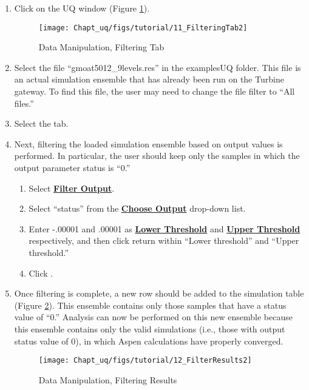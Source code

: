 \begin{enumerate}
	\item{Click  on the UQ window (Figure \ref{fig:uqt_data_filter}).}
	\begin{figure}[H]
		\centering
		\texttt{[image: Chapt\_uq/figs/tutorial/11\_FilteringTab2]}
		\caption{Data Manipulation, Filtering Tab}
		\label{fig:uqt_data_filter}
	\end{figure}
	\item{Select the file ``gmoat5012\_9levels.res'' in the examples\bs UQ folder. This
		file is an actual simulation ensemble that has already been run on the Turbine gateway.
		To find this file, the user may need to change the file filter to ``All files.''}
	\item{Select the  tab.}
	\item{Next, filtering the loaded simulation ensemble based on output values is performed. In particular,
		the user should keep only the samples in which the output parameter status is ``0.''}
	\begin{enumerate}
		\item{Select \textbf{\underline{Filter Output}}.}
		\item{Select ``status'' from the \textbf{\underline{Choose Output}} drop-down list.}
		\item{Enter -.00001 and .00001 as \textbf{\underline{Lower Threshold}} and \textbf{\underline{Upper Threshold}}
			respectively, and then click return within ``Lower threshold'' and ``Upper threshold.''}
		\item{Click .}
	\end{enumerate}
	\item{Once filtering is complete, a new row should be added to the
     simulation table (Figure \ref{fig:uqt_data_filter_results}). This
     ensemble contains only those samples that have a status value of
     ``0.'' Analysis can now be performed on this new ensemble because this
     ensemble contains only the valid simulations (i.e., those with output
     status value of 0), in which Aspen calculations have properly
     converged.
		\begin{figure}[H]
			\centering \texttt{[image: Chapt\_uq/figs/tutorial/12\_FilterResults2]}
			\caption{Data Manipulation, Filtering Results}
			\label{fig:uqt_data_filter_results}
		\end{figure}
	}
\end{enumerate}

